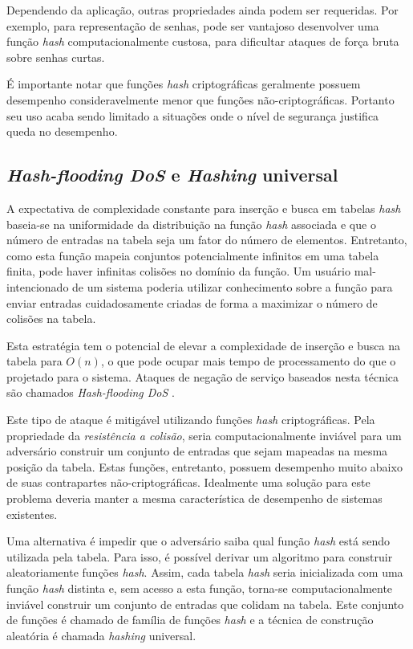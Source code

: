 Dependendo da aplicação, outras propriedades ainda podem ser requeridas. Por exemplo, para representação de senhas, pode ser vantajoso desenvolver uma função \emph{hash} computacionalmente custosa, para dificultar ataques de força bruta sobre senhas curtas.

É importante notar que funções \emph{hash} criptográficas geralmente possuem desempenho consideravelmente menor que funções não-criptográficas. Portanto seu uso acaba sendo limitado a situações onde o nível de segurança justifica queda no desempenho.

\subsection{\emph{Hash-flooding DoS} e \emph{Hashing} universal}

A expectativa de complexidade constante para inserção e busca em tabelas \emph{hash} baseia-se na uniformidade da distribuição na função \emph{hash} associada e que o número de entradas na tabela seja um fator do número de elementos. Entretanto, como esta função mapeia conjuntos potencialmente infinitos em uma tabela finita, pode haver infinitas colisões no domínio da função. Um usuário mal-intencionado de um sistema poderia utilizar conhecimento sobre a função para enviar entradas cuidadosamente criadas de forma a maximizar o número de colisões na tabela. 

Esta estratégia tem o potencial de elevar a complexidade de inserção e busca na tabela para $O(n)$, o que pode ocupar mais tempo de processamento do que o projetado para o sistema. Ataques de negação de serviço baseados nesta técnica são chamados \emph{Hash-flooding DoS} \cite{klink2011efficient}.

Este tipo de ataque é mitigável utilizando funções \emph{hash} criptográficas. Pela propriedade da \emph{resistência a colisão}, seria computacionalmente inviável para um adversário construir um conjunto de entradas que sejam mapeadas na mesma posição da tabela. Estas funções, entretanto, possuem desempenho muito abaixo de suas contrapartes não-criptográficas. Idealmente uma solução para este problema deveria manter a mesma característica de desempenho de sistemas existentes.

Uma alternativa é impedir que o adversário saiba qual função \emph{hash} está sendo utilizada pela tabela. Para isso, é possível derivar um algoritmo para construir aleatoriamente funções \emph{hash}. Assim, cada tabela \emph{hash} seria inicializada com uma função \emph{hash} distinta e, sem acesso a esta função, torna-se computacionalmente inviável construir um conjunto de entradas que colidam na tabela. Este conjunto de funções é chamado de família de funções \emph{hash} e a técnica de construção aleatória é chamada \emph{hashing} universal.

